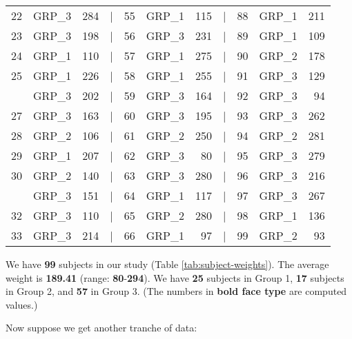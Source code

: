 \documentclass[smallextended]{svjour3}       %
\begin{document}
\begin{table}
\begin{tabular}[t]{rlrlrlrlrlr}
22 & GRP\_3 & 284 & | & 55 & GRP\_1 & 115 & | & 88 & GRP\_1 & 211\\
23 & GRP\_3 & 198 & | & 56 & GRP\_3 & 231 & | & 89 & GRP\_1 & 109\\
24 & GRP\_1 & 110 & | & 57 & GRP\_1 & 275 & | & 90 & GRP\_2 & 178\\
25 & GRP\_1 & 226 & | & 58 & GRP\_1 & 255 & | & 91 & GRP\_3 & 129\\
\addlinespace
26 & GRP\_3 & 202 & | & 59 & GRP\_3 & 164 & | & 92 & GRP\_3 & 94\\
27 & GRP\_3 & 163 & | & 60 & GRP\_3 & 195 & | & 93 & GRP\_3 & 262\\
28 & GRP\_2 & 106 & | & 61 & GRP\_2 & 250 & | & 94 & GRP\_2 & 281\\
29 & GRP\_1 & 207 & | & 62 & GRP\_3 & 80 & | & 95 & GRP\_3 & 279\\
30 & GRP\_2 & 140 & | & 63 & GRP\_3 & 280 & | & 96 & GRP\_3 & 216\\
\addlinespace
31 & GRP\_3 & 151 & | & 64 & GRP\_1 & 117 & | & 97 & GRP\_3 & 267\\
32 & GRP\_3 & 110 & | & 65 & GRP\_2 & 280 & | & 98 & GRP\_1 & 136\\
33 & GRP\_3 & 214 & | & 66 & GRP\_1 & 97 & | & 99 & GRP\_2 & 93\\
\bottomrule
\end{tabular}
\end{table}

We have \textbf{99} subjects in our study (Table \ref{tab:subject-weights}). The average weight is \textbf{189.41} (range: \textbf{80}-\textbf{294}). We have \textbf{25} subjects in Group 1, \textbf{17} subjects in Group 2, and \textbf{57} in Group 3. (The numbers in \textbf{bold face type} are computed values.)

Now suppose we get another tranche of data:
\end{document}
